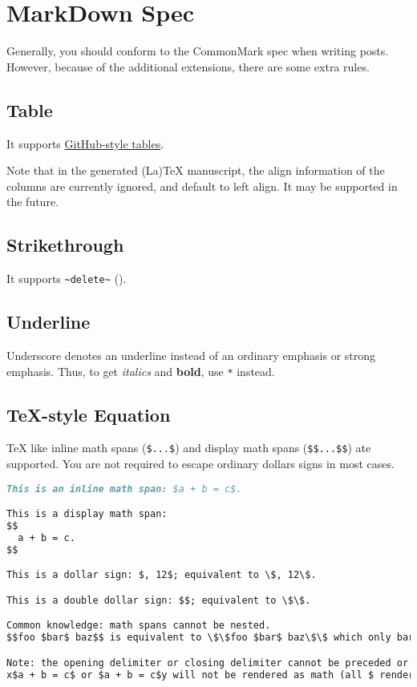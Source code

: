 \section{MarkDown Spec}
Generally, you should conform to the CommonMark spec when writing posts. However, because of the additional extensions, there are some extra rules.\par
\subsection{Table}
It supports \href{https://github.com/github/docs/blob/main/content/get-started/writing-on-github/working-with-advanced-formatting/organizing-information-with-tables.md}{GitHub-style tables}.\par
Note that in the generated (La)TeX manuscript, the align information of the columns are currently ignored, and default to left align. It may be supported in the future.\par
\subsection{Strikethrough}
It supports \verb!~delete~! ().\par
\subsection{Underline}
Underscore denotes an underline instead of an ordinary emphasis or strong emphasis. Thus, to get \textit{italics} and \textbf{bold}, use \verb!*! instead.\par
\subsection{TeX-style Equation}
TeX like inline math spans (\verb!$...$!) and display math spans (\verb!$$...$$!) ate supported. You are not required to escape ordinary dollars signs in most cases.\par
\begin{lstlisting}[language=Markdown]
This is an inline math span: $a + b = c$.

This is a display math span:
$$
  a + b = c.
$$

This is a dollar sign: $, 12$; equivalent to \$, 12\$.

This is a double dollar sign: $$; equivalent to \$\$.

Common knowledge: math spans cannot be nested.
$$foo $bar$ baz$$ is equivalent to \$\$foo $bar$ baz\$\$ which only bar is rendered as equation.

Note: the opening delimiter or closing delimiter cannot be preceded or followed by an alphanumeric character.
x$a + b = c$ or $a + b = c$y will not be rendered as math (all $ rendered as \$)
\end{lstlisting}
